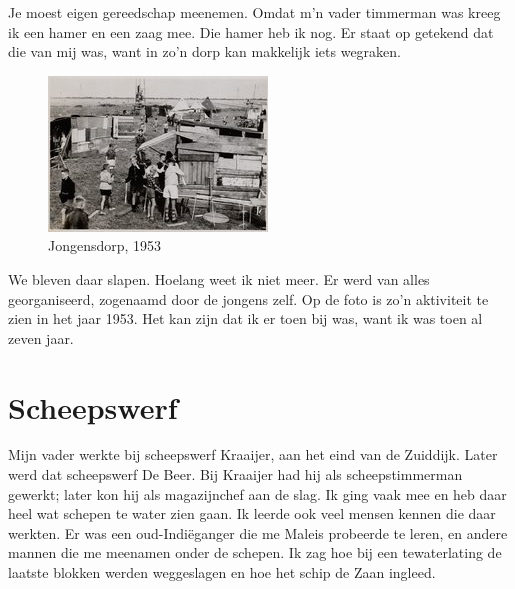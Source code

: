 \documentclass[12pt,twoside, openright]{memoir}
\begin{document}
Je moest eigen gereedschap meenemen. Omdat m’n vader timmerman was kreeg ik een hamer en een zaag mee. Die hamer heb ik nog. Er staat op getekend dat die van mij was, want in zo’n dorp kan makkelijk iets wegraken. 

\begin{figure}
\includegraphics[width=\textwidth]{img/ch14/jongensdorp1953}
\caption*{\footnotesize Jongensdorp, 1953}
\end{figure}

We bleven daar slapen. Hoelang weet ik niet meer. Er werd van alles georganiseerd, zogenaamd door de jongens zelf. Op de foto is zo’n aktiviteit te zien in het jaar 1953. Het kan zijn dat ik er toen bij was, want ik was toen al zeven jaar.

\chapter{Scheepswerf} %
\label{cha:scheepswerf}

Mijn vader werkte bij scheepswerf Kraaijer, aan het eind van de Zuiddijk. Later werd dat scheepswerf De Beer. Bij Kraaijer had hij als scheepstimmerman gewerkt; later kon hij als magazijnchef aan de slag. Ik ging vaak mee en heb daar heel wat schepen te water zien gaan. Ik leerde ook veel mensen kennen die daar werkten. Er was een oud-Indiëganger die me Maleis probeerde te leren, en andere mannen die me meenamen onder de schepen. Ik zag hoe bij een tewaterlating de laatste blokken werden weggeslagen en hoe het schip de Zaan ingleed. 
\end{document}

